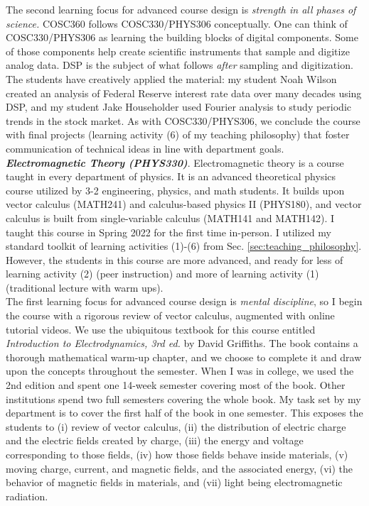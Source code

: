 \documentclass[../../../main.tex]{subfiles}
\begin{document}
The second learning focus for advanced course design is \textit{strength in all phases of science.}  COSC360 follows COSC330/PHYS306 conceptually.  One can think of COSC330/PHYS306 as learning the building blocks of digital components.  Some of those components help create scientific instruments that sample and digitize analog data.  DSP is the subject of what follows \textit{after} sampling and digitization.  The students have creatively applied the material: my student Noah Wilson created an analysis of Federal Reserve interest rate data over many decades using DSP, and my student Jake Householder used Fourier analysis to study periodic trends in the stock market.  As with COSC330/PHYS306, we conclude the course with final projects (learning activity (6) of my teaching philosophy) that foster communication of technical ideas in line with department goals.
\\
\vspace{0.15cm}
\textbf{\textit{Electromagnetic Theory (PHYS330)}}.  Electromagnetic theory is a course taught in every department of physics.  It is an advanced theoretical physics course utilized by 3-2 engineering, physics, and math students.  It builds upon vector calculus (MATH241) and calculus-based physics II (PHYS180), and vector calculus is built from single-variable calculus (MATH141 and MATH142).  I taught this course in Spring 2022 for the first time in-person.  I utilized my standard toolkit of learning activities (1)-(6) from Sec. \ref{sec:teaching_philosophy}.  However, the students in this course are more advanced, and ready for less of learning activity (2) (peer instruction) and more of learning activity (1) (traditional lecture with warm ups).
\\
\vspace{0.15cm}
The first learning focus for advanced course design is \textit{mental discipline}, so I begin the course with a rigorous review of vector calculus, augmented with online tutorial videos.  We use the ubiquitous textbook for this course entitled \textit{Introduction to Electrodynamics, 3rd ed.} by David Griffiths.  The book contains a thorough mathematical warm-up chapter, and we choose to complete it and draw upon the concepts throughout the semester.  When I was in college, we used the 2nd edition and spent one 14-week semester covering most of the book.  Other institutions spend two full semesters covering the whole book.  My task set by my department is to cover the first half of the book in one semester.  This exposes the students to (i) review of vector calculus, (ii) the distribution of electric charge and the electric fields created by charge, (iii) the energy and voltage corresponding to those fields, (iv) how those fields behave inside materials, (v) moving charge, current, and magnetic fields, and the associated energy, (vi) the behavior of magnetic fields in materials, and (vii) light being electromagnetic radiation.
\end{document}
